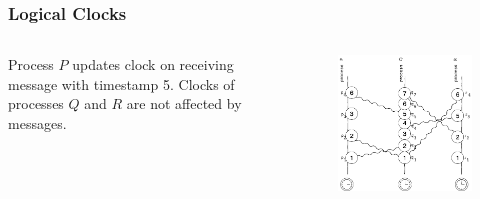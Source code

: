\documentclass{beamer}
\begin{document}
\frame
{
	\frametitle{Logical Clocks}

	\begin{columns}
	\begin{column}{0.6\textwidth}

		Process $P$ updates clock on receiving message with timestamp 5.
		Clocks of processes $Q$ and $R$ are not affected by messages.


	\end{column}
	\begin{column}{0.4\textwidth}

		\begin{figure}[ht!]
		\includegraphics[width=\textwidth]{files/ClockDist-Impl-Logical-Clock-6.png}
		\end{figure}


	\end{column}
	\end{columns}


}
\end{document}
